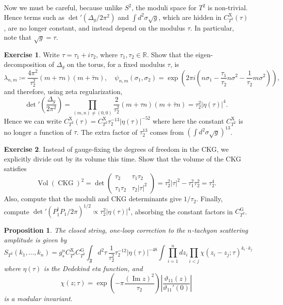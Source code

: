 \documentclass{report}
\theoremstyle{plain}
\newtheorem{proposition}[theorem]{Proposition}
\theoremstyle{definition}
\newtheorem{exercise}{Exercise}[section]
\theoremstyle{remark}
\newcommand{\bR}{\mathbb{R}}
\newcommand{\fF}{\mathfrak{F}}
\DeclareMathOperator{\Vol}{Vol}
\DeclareMathOperator{\im}{Im}
\DeclareMathOperator{\CKG}{CKG}
\begin{document}
Now we must be careful, because unlike $S^2$, the moduli space for
$T^2$ is non-trivial. Hence terms such as $\det'(\Delta_g/2\pi^2)$ and
$\int d^2\sigma \sqrt{g}$, which are hidden in
$C_{T^2}^{\text{X}}(\tau)$, are no longer constant, and instead depend
on the modulus $\tau$. In particular, note that $\sqrt{g} = \tau$.

\begin{exercise}
  Write $\tau = \tau_1 + i\tau_2$, where $\tau_1, \tau_2 \in \bR$.
  Show that the eigen-decomposition of $\Delta_g$ on the torus, for a
  fixed modulus $\tau$, is
  \[ \lambda_{n,m} \coloneqq \frac{4\pi^2}{\tau_2^2} (m + \tau n)(m + \bar{\tau} n), \quad \psi_{n,m}(\sigma_1, \sigma_2) = \exp\left(2\pi i \left(n\sigma_1 - \frac{\tau_1}{\tau_2} n\sigma^2 - \frac{1}{\tau_2} m\sigma^2\right)\right), \]
  and therefore, using zeta regularization,
  \[ \det\nolimits' \left(\frac{\Delta_g}{2\pi^2}\right) = \prod_{(m,n) \neq (0,0)} \frac{2}{\tau_2^2} (m + \tau n)(m + \bar{\tau} n) = \tau_2^2 |\eta(\tau)|^4. \]
  Hence we can write $C_{T^2}^{\text{X}}(\tau) = C_{T^2}^{\text{X}}
  \tau_2^{-13} |\eta(\tau)|^{-52}$ where here the constant
  $C_{T^2}^{\text{X}}$ is no longer a function of $\tau$. The extra
  factor of $\tau_2^{13}$ comes from $(\int d^2\sigma \sqrt{g})^{13}$.
\end{exercise}

\begin{exercise}
  Instead of gauge-fixing the degrees of freedom in the CKG, we
  explicitly divide out by its volume this time. Show that the volume
  of the CKG satisfies
  \[ \Vol(\CKG)^2 = \det\begin{pmatrix} \tau_2 & \tau_1 \tau_2 \\ \tau_1 \tau_2 & \tau_2 |\tau|^2 \end{pmatrix} = \tau_2^2|\tau|^2 - \tau_1^2 \tau_2^2 = \tau_2^4. \]
  Also, compute that the moduli and CKG determinants give $1/\tau_2$.
  Finally, compute $\det'(P_1^\dag P_1/2\pi)^{1/2} \propto
  \tau_2^2|\eta(\tau)|^4$, absorbing the constant factors in
  $C_{T^2}^{\text{G}}$.
\end{exercise}

\begin{proposition}
  The closed string, one-loop correction to the $n$-tachyon scattering
  amplitude is given by
  \[ S_{T^2}(k_1, \ldots, k_n) = g_s^n C_{T^2}^{\text{X}} C_{T^2}^{\text{G}} \int_{\fF} d^2\tau \, \frac{1}{\tau_2^2} \tau_2^{-12} |\eta(\tau)|^{-48} \int \prod_{i=1}^n dz_i \prod_{i<j} \chi(z_i - z_j; \tau)^{k_i \cdot k_j} \]
  where $\eta(\tau)$ is the Dedekind eta function, and
  \[ \chi(z; \tau) = \exp\left(-\pi \frac{(\im z)^2}{\tau_2}\right) \left|\frac{\vartheta_{11}(z)}{\vartheta_{11}'(0)}\right| \]
  is a modular invariant.
\end{proposition}
\end{document}
